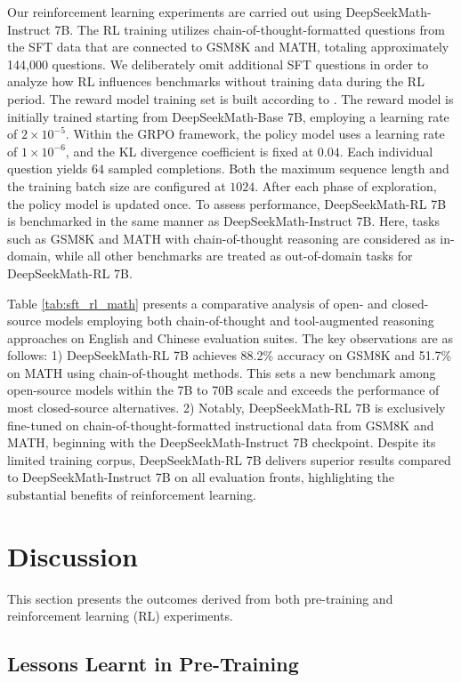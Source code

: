 \begin{itemize}[topsep=0pt]
\begin{itemize}[topsep=0pt]
Our reinforcement learning experiments are carried out using DeepSeekMath-Instruct 7B. The RL training utilizes chain-of-thought-formatted questions from the SFT data that are connected to GSM8K and MATH, totaling approximately 144,000 questions. We deliberately omit additional SFT questions in order to analyze how RL influences benchmarks without training data during the RL period. The reward model training set is built according to \citep{wang2023math}. The reward model is initially trained starting from DeepSeekMath-Base 7B, employing a learning rate of $2 \times 10^{-5}$. Within the GRPO framework, the policy model uses a learning rate of $1 \times 10^{-6}$, and the KL divergence coefficient is fixed at $0.04$. Each individual question yields $64$ sampled completions. Both the maximum sequence length and the training batch size are configured at $1024$. After each phase of exploration, the policy model is updated once. To assess performance, DeepSeekMath-RL 7B is benchmarked in the same manner as DeepSeekMath-Instruct 7B. Here, tasks such as GSM8K and MATH with chain-of-thought reasoning are considered as in-domain, while all other benchmarks are treated as out-of-domain tasks for DeepSeekMath-RL 7B.

Table \ref{tab:sft_rl_math} presents a comparative analysis of open- and closed-source models employing both chain-of-thought and tool-augmented reasoning approaches on English and Chinese evaluation suites. The key observations are as follows: 1) DeepSeekMath-RL 7B achieves 88.2\% accuracy on GSM8K and 51.7\% on MATH using chain-of-thought methods. This sets a new benchmark among open-source models within the 7B to 70B scale and exceeds the performance of most closed-source alternatives. 2) Notably, DeepSeekMath-RL 7B is exclusively fine-tuned on chain-of-thought-formatted instructional data from GSM8K and MATH, beginning with the DeepSeekMath-Instruct 7B checkpoint. Despite its limited training corpus, DeepSeekMath-RL 7B delivers superior results compared to DeepSeekMath-Instruct 7B on all evaluation fronts, highlighting the substantial benefits of reinforcement learning.

\section{Discussion}
This section presents the outcomes derived from both pre-training and reinforcement learning (RL) experiments.

\subsection{Lessons Learnt in Pre-Training}


\end{itemize}
\end{itemize}
